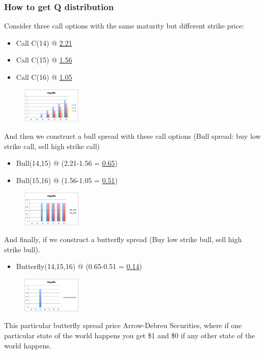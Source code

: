 \begin{multicols}{2}
\subsubsection{How to get Q distribution}
Consider three call options with the same maturity but different strike price:
\begin{itemize}
    \item Call C(14) @ \underline{2.21}
    \item Call C(15) @ \underline{1.56}
    \item Call C(16) @ \underline{1.05}
\end{itemize}
\begin{figure}[H]
    \centering 
    \includegraphics[width =0.25\textwidth]{Figure/Q_call.png}
\end{figure}
And then we construct a bull spread with these call options (Bull spread: buy low strike call, sell high strike call) 
\begin{itemize}
    \item Bull(14,15) @ (2.21-1.56 = \underline{0.65})
    \item Bull(15,16) @ (1.56-1.05 = \underline{0.51})
\end{itemize}
\begin{figure}[H]
    \centering 
    \includegraphics[width =0.25\textwidth]{Figure/Q_bull.png}
\end{figure}
And finally, if we construct a butterfly spread (Buy low strike bull, sell high strike bull). 
\begin{itemize}
    \item Butterfly(14,15,16) @ (0.65-0.51 = \underline{0.14})
\end{itemize}
\begin{figure}[H]
    \centering 
    \includegraphics[width =0.25\textwidth]{Figure/Q_butter.png}
\end{figure}
This particular butterfly spread price Arrow-Debreu Securities, where if one particular state of the world happens you get \$1 and \$0 if any other state of the world happens.\par


\end{multicols}
